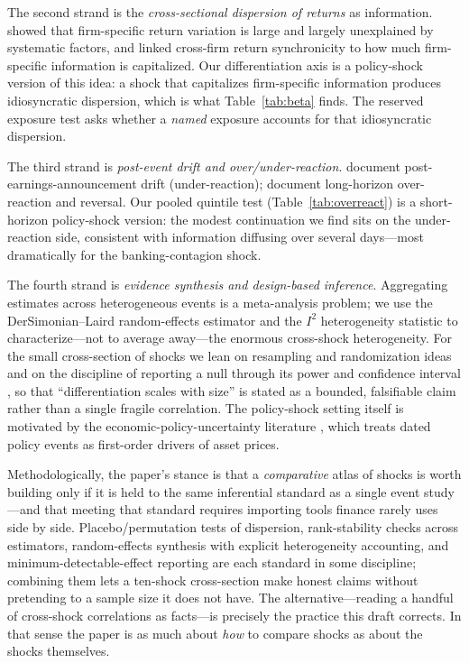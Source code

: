 \documentclass[12pt]{article}
\begin{document}
The second strand is the \emph{cross-sectional dispersion of returns} as information. \citet{roll1988}
showed that firm-specific return variation is large and largely unexplained by systematic factors,
and \citet{morck2000} linked cross-firm return synchronicity to how much firm-specific information
is capitalized. Our differentiation axis is a policy-shock version of this idea: a shock that
capitalizes firm-specific information produces idiosyncratic dispersion, which is what
Table~\ref{tab:beta} finds. The reserved exposure test asks whether a \emph{named} exposure
accounts for that idiosyncratic dispersion.

The third strand is \emph{post-event drift and over/under-reaction}. \citet{bernard1989} document
post-earnings-announcement drift (under-reaction); \citet{debondt1985} document long-horizon
over-reaction and reversal. Our pooled quintile test (Table~\ref{tab:overreact}) is a short-horizon
policy-shock version: the modest continuation we find sits on the under-reaction side, consistent
with information diffusing over several days---most dramatically for the banking-contagion shock.

The fourth strand is \emph{evidence synthesis and design-based inference}. Aggregating estimates
across heterogeneous events is a meta-analysis problem; we use the DerSimonian--Laird random-effects
estimator \citep{dersimonian1986} and the $I^2$ heterogeneity statistic \citep{higgins2002} to
characterize---not to average away---the enormous cross-shock heterogeneity. For the small
cross-section of shocks we lean on resampling and randomization ideas \citep{efron1979,young2019}
and on the discipline of reporting a null through its power and confidence interval
\citep{abadie2020}, so that ``differentiation scales with size'' is stated as a bounded, falsifiable
claim rather than a single fragile correlation. The policy-shock setting itself is motivated by the
economic-policy-uncertainty literature \citep{baker2016}, which treats dated policy events as
first-order drivers of asset prices.

Methodologically, the paper's stance is that a \emph{comparative} atlas of shocks is worth building
only if it is held to the same inferential standard as a single event study---and that meeting that
standard requires importing tools finance rarely uses side by side. Placebo/permutation tests of
dispersion, rank-stability checks across estimators, random-effects synthesis with explicit
heterogeneity accounting, and minimum-detectable-effect reporting are each standard in some
discipline; combining them lets a ten-shock cross-section make honest claims without pretending to a
sample size it does not have. The alternative---reading a handful of cross-shock correlations as
facts---is precisely the practice this draft corrects. In that sense the paper is as much about
\emph{how} to compare shocks as about the shocks themselves.
\end{document}
